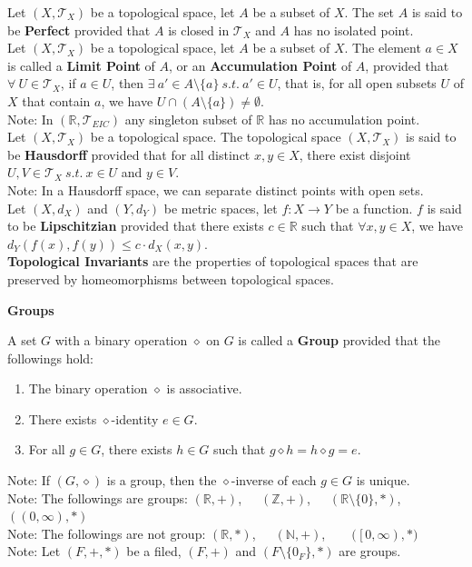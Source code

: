 \documentclass[11pt]{article}
\newcommand{\R}{\mathbb{R}}
\newcommand{\N}{\mathbb{N}}
\newcommand{\Z}{\mathbb{Z}}
\newcommand{\T}{\mathcal{T}}
\newcommand{\note}{\color{gray}Note: \color{black}}
\begin{document}
		\noindent Let $(X,\T_X)$ be a topological space, let $A$ be a subset of $X$. The set $A$ is said to be \textbf{Perfect} provided that $A$ is closed in $\T_X$ and $A$ has no isolated point.\\
		
		\noindent Let $(X,\T_X)$ be a topological space, let $A$ be a subset of $X$. The element $a \in X$ is called a \textbf{Limit Point} of $A$, or an \textbf{Accumulation Point} of $A$, provided that $\forall \ U \in \T_X$, if $a \in U$, then $\exists \ a' \in A \setminus \{a\} \ s.t. \ a' \in U$, that is, for all open subsets $U$ of $X$ that contain $a$, we have $U \cap (A \setminus \{a\}) \neq \emptyset$.\\
		\note In $(\R,\T_{EIC})$ any singleton subset of $\R$ has no accumulation point.\\
		
		\noindent Let $(X,\T_X)$ be a topological space. The topological space $(X,\T_X)$ is said to be \textbf{Hausdorff} provided that for all distinct $x,y \in X$, there exist disjoint $U,V \in \T_X \ s.t. \ x \in U$ and $y \in V$.\\
		\note In a Hausdorff space, we can separate distinct points with open sets.\\		
		
		\noindent Let $(X,d_X)$ and $(Y,d_Y)$ be metric spaces, let $f:X \to Y$ be a function. $f$ is said to be \textbf{Lipschitzian} provided that there exists $c \in \R$ such that $\forall x,y \in X$, we have $d_Y(f(x),f(y)) \leq c \cdot d_X(x,y)$.\\
		
		\noindent \textbf{Topological Invariants} are the properties of  topological spaces that are preserved by homeomorphisms between topological spaces.
		
	\clearpage






	\LARGE \color{red}
		\noindent \textbf{Groups}\\
	\normalsize \color{black}	
	
		\noindent A set $G$ with a binary operation $\diamond$ on $G$ is called a \textbf{Group} provided that the followings hold:
		\begin{enumerate}[topsep=3pt,itemsep=-1ex,partopsep=1ex,parsep=1ex]
			\item The binary operation $\diamond$ is associative.
			\item There exists $\diamond$-identity $e \in G$.
			\item For all $g \in G$, there exists $h \in G$ such that $g \diamond h =h \diamond g =e$.
		\end{enumerate}
		\note If $(G,\diamond)$ is a group, then the $\diamond$-inverse of each $g \in G$ is unique.\\
		\note The followings are groups: $(\R,+)$,\ \ \ $(\Z,+)$,\ \ \ $(\R \setminus \{0 \},\ast)$,\ \ \ $((0,\infty),\ast)$\\
		\note The followings are not group: $(\R,\ast)$,\ \ \ $(\N, +)$, \ \ \ $([\,0,\infty),\ast)$\\
		\note Let $(F,+,\ast)$ be a filed, $(F,+)$ and $(F\setminus \{0_F\}, \ast)$ are groups.\\
		
\end{document}
